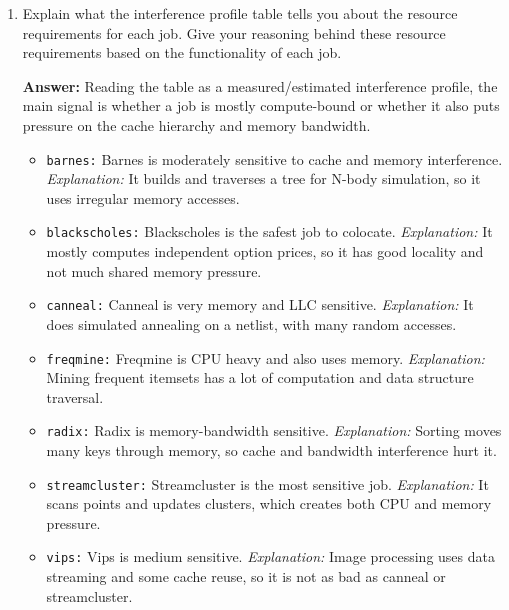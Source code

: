 \begin{enumerate}
\begin{enumerate}
\begin{center}
        \vspace{0.2cm}
        \small{\textit{Note: the CPU-interference behavior was exercised in our automated Part 2A run. The remaining interference columns are completed as a qualitative profile, guided by the benchmark behavior and the expected resource pressure of each workload.}}
        \end{center}

        \item Explain what the interference profile table tells you about the resource requirements for each job. Give your reasoning behind these resource requirements based on the functionality of each job.

        \textbf{Answer:} Reading the table as a measured/estimated interference profile, the main signal is whether a job is mostly compute-bound or whether it also puts pressure on the cache hierarchy and memory bandwidth.
        \begin{itemize}
            \item \texttt{barnes:} Barnes is moderately sensitive to cache and memory interference. \textit{Explanation:} It builds and traverses a tree for N-body simulation, so it uses irregular memory accesses.
            \item \texttt{blackscholes:} Blackscholes is the safest job to colocate. \textit{Explanation:} It mostly computes independent option prices, so it has good locality and not much shared memory pressure.
            \item \texttt{canneal:} Canneal is very memory and LLC sensitive. \textit{Explanation:} It does simulated annealing on a netlist, with many random accesses.
            \item \texttt{freqmine:} Freqmine is CPU heavy and also uses memory. \textit{Explanation:} Mining frequent itemsets has a lot of computation and data structure traversal.
            \item \texttt{radix:} Radix is memory-bandwidth sensitive. \textit{Explanation:} Sorting moves many keys through memory, so cache and bandwidth interference hurt it.
            \item \texttt{streamcluster:} Streamcluster is the most sensitive job. \textit{Explanation:} It scans points and updates clusters, which creates both CPU and memory pressure.
            \item \texttt{vips:} Vips is medium sensitive. \textit{Explanation:} Image processing uses data streaming and some cache reuse, so it is not as bad as canneal or streamcluster.
         \end{itemize}


\end{enumerate}
\end{enumerate}

